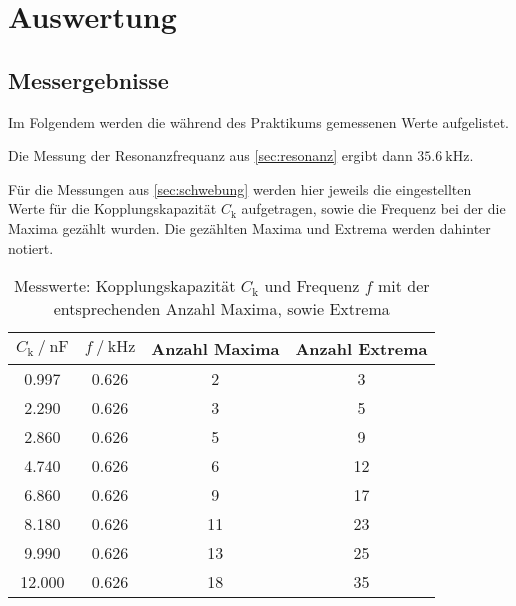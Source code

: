 \section{Auswertung}
\label{sec:Auswertung}




\subsection{Messergebnisse}

Im Folgendem werden die während des Praktikums gemessenen Werte aufgelistet.

Die Messung der Resonanzfrequanz aus \autoref{sec:resonanz} ergibt dann $\SI{35.6}{\kilo\hertz}$.

Für die Messungen aus \autoref{sec:schwebung} werden hier jeweils die eingestellten Werte für die Kopplungskapazität $C_\text{k}$ aufgetragen, sowie die Frequenz bei der die Maxima gezählt wurden. Die gezählten Maxima und Extrema werden dahinter notiert. 

\begin{table}
  \centering
  \caption{Messwerte: Kopplungskapazität $C_\text{k}$ und Frequenz $f$ mit der entsprechenden Anzahl Maxima, sowie Extrema}
  \label{tab:schwebung}
  \begin{tabular}{c c c c}
    \toprule 
    $C_\text{k} \:/\: \si{\nano\farad}$ & $f \:/\: \si{\kilo\hertz}$ & Anzahl Maxima &  Anzahl Extrema   \\ 
    \midrule 
    0.997 & 0.626 & 2 & 3 \\
    2.290 & 0.626 & 3 & 5 \\
    2.860 & 0.626 & 5 & 9 \\
    4.740 & 0.626 & 6 & 12 \\
    6.860 & 0.626 & 9 & 17 \\
    8.180 & 0.626 & 11 & 23 \\
    9.990 & 0.626 & 13 & 25 \\
    12.000 & 0.626 & 18 & 35 \\
    \bottomrule
  \end{tabular}
\end{table}

